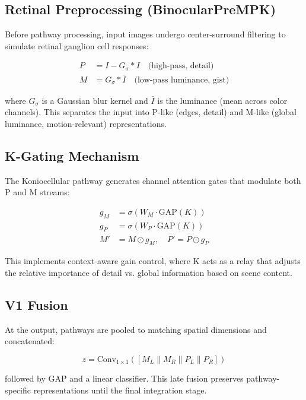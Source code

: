 \documentclass[11pt]{article}
\begin{document}
\subsection{Retinal Preprocessing (BinocularPreMPK)}

Before pathway processing, input images undergo center-surround filtering to simulate retinal ganglion cell responses:

\begin{align}
    P &= I - G_\sigma * I \quad \text{(high-pass, detail)} \\
    M &= G_\sigma * \bar{I} \quad \text{(low-pass luminance, gist)}
\end{align}

where $G_\sigma$ is a Gaussian blur kernel and $\bar{I}$ is the luminance (mean across color channels). This separates the input into P-like (edges, detail) and M-like (global luminance, motion-relevant) representations.

\subsection{K-Gating Mechanism}

The Koniocellular pathway generates channel attention gates that modulate both P and M streams:

\begin{align}
    g_M &= \sigma(W_M \cdot \text{GAP}(K)) \\
    g_P &= \sigma(W_P \cdot \text{GAP}(K)) \\
    M' &= M \odot g_M, \quad P' = P \odot g_P
\end{align}

This implements context-aware gain control, where K acts as a relay that adjusts the relative importance of detail vs. global information based on scene content.

\subsection{V1 Fusion}

At the output, pathways are pooled to matching spatial dimensions and concatenated:

\begin{equation}
    z = \text{Conv}_{1\times1}([M_L \| M_R \| P_L \| P_R])
\end{equation}

followed by GAP and a linear classifier. This late fusion preserves pathway-specific representations until the final integration stage.
\end{document}
